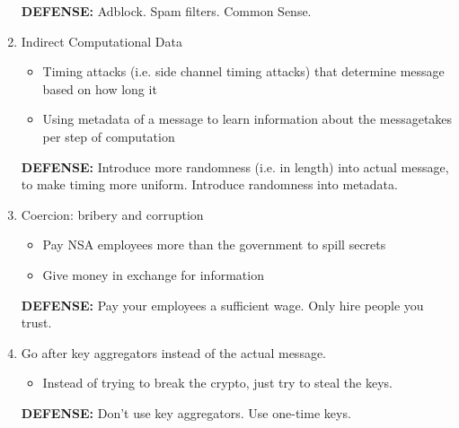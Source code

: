 \documentclass[11pt]{article}
\begin{document}
\begin{enumerate}
\begin{itemize}
	\end{itemize}
	\textbf{DEFENSE: } Adblock. Spam filters. Common Sense.
\item Indirect Computational Data
	\begin{itemize}
	\item Timing attacks (i.e. side channel timing attacks) that determine message based on how long it 
	\item Using metadata of a message to learn information about the messagetakes per step of computation
	\end{itemize}
	\textbf{DEFENSE: } Introduce more randomness (i.e. in length) into actual message, to make timing more uniform. Introduce randomness into metadata.
\item Coercion: bribery and corruption
	\begin{itemize}
	\item Pay NSA employees more than the government to spill secrets
	\item Give money in exchange for information
	\end{itemize}
	\textbf{DEFENSE: } Pay your employees a sufficient wage. Only hire people you trust.
\item Go after key aggregators instead of the actual message.
	\begin{itemize}
	\item Instead of trying to break the crypto, just try to steal the keys.
	\end{itemize}
	\textbf{DEFENSE: } Don't use key aggregators. Use one-time keys.

\end{enumerate}
\end{document}
